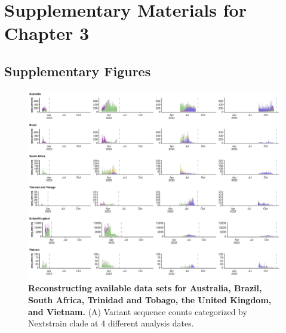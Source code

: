 \graphicspath{{./chapters/ncov-forecasting-fit/}}
\chapter{Supplementary Materials for Chapter 3} 

\section{Supplementary Figures}


%

\begin{figure}[th!]
	\centering
	\includegraphics[width=0.9\textwidth=0.01]{supp_figures/Supplementary_Fig_1A.png}
	\caption{
		\textbf{Reconstructing available data sets for Australia, Brazil, South Africa, Trinidad and Tobago, the United Kingdom, and Vietnam.}
		(A) Variant sequence counts categorized by Nextstrain clade at 4 different analysis dates.
	}
	\label{fig:S1}
\end{figure}


